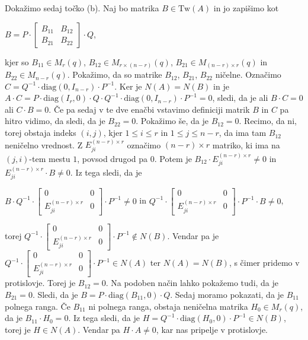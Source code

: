 \documentclass[mat1, tisk]{fmfdelo}
\begin{document}
\begin{dokaz}
  Dokažimo sedaj točko (b). Naj bo matrika $B \in \text{Tw}(A)$ in jo zapišimo kot 
  \begin{center}
    $B = P \cdot 
    \begin{bmatrix}
      B_{11} & B_{12} \\
      B_{21} & B_{22}
    \end{bmatrix}
    \cdot Q$, 
  \end{center}
  kjer so $B_{11} \in M_{r}(q)$, $B_{12} \in M_{r \times (n-r)}(q)$, $B_{21} \in M_{(n-r) \times r}(q)$ 
  in $B_{22} \in M_{n-r}(q)$. Pokažimo, da so matrike $B_{12}$, $B_{21}$, $B_{22}$ ničelne. 
  Označimo $C = Q^{-1} \cdot \text{diag}(0, I_{n-r}) \cdot P^{-1}$. Ker je $N(A) = N(B)$ 
  in je $A \cdot C = P \cdot \text{diag}(I_r, 0) \cdot Q \cdot Q^{-1} \cdot \text{diag}(0, I_{n-r}) \cdot P^{-1} = 0$, 
  sledi, da je ali $B \cdot C = 0$ ali $C \cdot B = 0$. Če pa sedaj v te dve enačbi vstavimo definiciji 
  matrik $B$ in $C$ pa hitro vidimo, da sledi, da je $B_{22} = 0$. Pokažimo še, da je $B_{12} = 0$. 
  Recimo, da ni, torej obstaja indeks $(i,j)$, kjer $1 \leq i \leq r$ in $1 \leq j \leq n-r$, da 
  ima tam $B_{12}$ neničelno vrednost. Z $E_{ji}^{(n-r) \times r}$ označimo $(n-r) \times r$ matriko, 
  ki ima na $(j,i)$-tem mestu $1$, povsod drugod pa $0$. Potem je $B_{12} \cdot E_{ji}^{(n-r) \times r} \neq 0$ 
  in $E_{ji}^{(n-r) \times r} \cdot B \neq 0$. Iz tega sledi, da je 
  \begin{center}
    $B \cdot Q^{-1} \cdot 
  \begin{bmatrix}
    0 & 0 \\
    E_{ji}^{(n-r) \times r} & 0
  \end{bmatrix}
  \cdot P^{-1} \neq 0$ \; in \; 
  $Q^{-1} \cdot 
  \begin{bmatrix}
    0 & 0 \\
    E_{ji}^{(n-r) \times r} & 0
  \end{bmatrix}
  \cdot P^{-1} \cdot B \neq 0$, 
  \end{center}
  torej 
  $Q^{-1} \cdot 
  \begin{bmatrix}
    0 & 0 \\
    E_{ji}^{(n-r) \times r} & 0
  \end{bmatrix}
  \cdot P^{-1} \notin N(B)$. Vendar pa je 
  $Q^{-1} \cdot 
  \begin{bmatrix}
    0 & 0 \\
    E_{ji}^{(n-r) \times r} & 0
  \end{bmatrix}
  \cdot P^{-1} \in N(A)$ ter $N(A) = N(B)$, s čimer pridemo v protislovje. 
  Torej je $B_{12} = 0$. Na podoben način lahko pokažemo tudi, da je $B_{21} = 0$. 
  Sledi, da je $B = P \cdot \text{diag}(B_{11}, 0) \cdot Q$. Sedaj moramo pokazati, da je 
  $B_{11}$ polnega ranga. Če $B_{11}$ ni polnega ranga, obstaja neničelna matrika 
  $H_0 \in M_r (q)$, da je $B_{11} \cdot H_0 = 0$. Iz tega sledi, da je 
  $H = Q^{-1} \cdot \text{diag}(H_0, 0) \cdot P^{-1} \in N(B)$, torej je $H \in N(A)$. 
  Vendar pa $H \cdot A \neq 0$, kar nas pripelje v protislovje.


\end{dokaz}
\end{document}
